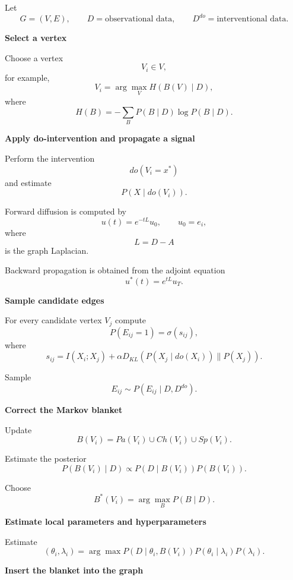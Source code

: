 \documentclass[11pt]{article}
\begin{document}
\begin{algorithm}[H]
\caption{Bayesian Sequential Reconstruction of a Structural Causal Model}
\label{alg:bayesian_scm}
\begin{algorithmic}[1]

\State Let
\[
G=(V,E), \qquad
D=\text{observational data}, \qquad
D^{do}=\text{interventional data}.
\]

\Repeat

\State \textbf{Select a vertex}

Choose a vertex
\[
V_i\in V,
\]
for example,
\[
V_i
=
\arg\max_{V}
H(B(V)\mid D),
\]
where
\[
H(B)
=
-\sum_B
P(B\mid D)\log P(B\mid D).
\]

\State \textbf{Apply do-intervention and propagate a signal}

Perform the intervention
\[
do(V_i=x^*)
\]
and estimate
\[
P(X\mid do(V_i)).
\]

Forward diffusion is computed by
\[
u(t)=e^{-tL}u_0,
\qquad
u_0=e_i,
\]
where
\[
L=D-A
\]
is the graph Laplacian.

Backward propagation is obtained from the adjoint equation
\[
u^*(t)=e^{tL}u_T.
\]

\State \textbf{Sample candidate edges}

For every candidate vertex $V_j$ compute
\[
P(E_{ij}=1)
=
\sigma(s_{ij}),
\]
where
\[
s_{ij}
=
I(X_i;X_j)
+
\alpha
D_{KL}
\!\left(
P(X_j\mid do(X_i))
\|
P(X_j)
\right).
\]

Sample
\[
E_{ij}
\sim
P(E_{ij}\mid D,D^{do}).
\]

\State \textbf{Correct the Markov blanket}

Update
\[
B(V_i)
=
Pa(V_i)
\cup
Ch(V_i)
\cup
Sp(V_i).
\]

Estimate the posterior
\[
P(B(V_i)\mid D)
\propto
P(D\mid B(V_i))
P(B(V_i)).
\]

Choose
\[
B^*(V_i)
=
\arg\max_B
P(B\mid D).
\]

\State \textbf{Estimate local parameters and hyperparameters}

Estimate
\[
(\theta_i,\lambda_i)
=
\arg\max
P(D\mid\theta_i,B(V_i))
P(\theta_i\mid\lambda_i)
P(\lambda_i).
\]

\State \textbf{Insert the blanket into the graph}


\end{algorithmic}
\end{algorithm}
\end{document}
